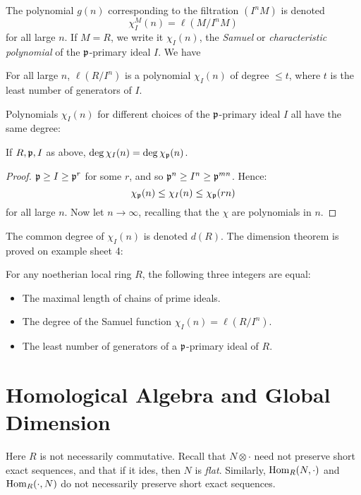 \documentclass[10pt,a4paper]{article}
\begin{document}
The polynomial $g(n)$ corresponding to the filtration $(I^n M)$ is denoted
\[\chi_I^M(n) = \ell(M/I^nM)\]
for all large $n$. If $M = R$, we write it $\chi_I(n)$, the \emph{Samuel} or \emph{characteristic polynomial} of the $\mathfrak{p}$-primary ideal $I$. We have
\begin{corollary}
  For all large $n$, $\ell(R/I^n)$ is a polynomial $\chi_{I}(n)$ of degree $\leq t$, where $t$ is the least number of generators of $I$.
\end{corollary}
Polynomials $\chi_I(n)$ for different choices of the $\mathfrak{p}$-primary ideal $I$ all have the same degree:
\begin{proposition}
  If $R, \mathfrak{p}, I$ as above, $\deg \chi_I(n) = \deg \chi_{\mathfrak{p}}(n)$.
\end{proposition}
\begin{proof}
  $\mathfrak{p} \geq I \geq \mathfrak{p}^r$ for some $r$, and so $\mathfrak{p}^n \geq I^n \geq \mathfrak{p}^{mn}$. Hence:
  \[\chi_{\mathfrak{p}}(n) \leq \chi_I(n) \leq \chi_{\mathfrak{p}}(rn)\]
  for all large $n$. Now let $n \to \infty$, recalling that the $\chi$ are polynomials in $n$.
\end{proof}
The common degree of $\chi_I(n)$ is denoted $d(R)$. The dimension theorem is proved on example sheet 4:
\begin{theorem}[AM 11.14]
  For any noetherian local ring $R$, the following three integers are equal:
  \begin{itemize}
    \item The maximal length of chains of prime ideals.
    \item The degree of the Samuel function $\chi_I(n) = \ell(R/I^n)$.
    \item The least number of generators of a $\mathfrak{p}$-primary ideal of $R$.
  \end{itemize}
\end{theorem}
\section{Homological Algebra and Global Dimension}
Here $R$ is not necessarily commutative. Recall that $N \otimes \cdot$ need not preserve short exact sequences, and that if it ides, then $N$ is \emph{flat}. Similarly, $\operatorname{Hom}_R(N, \cdot)$ and $\operatorname{Hom}_R(\cdot, N)$ do not necessarily preserve short exact sequences.
\end{document}
